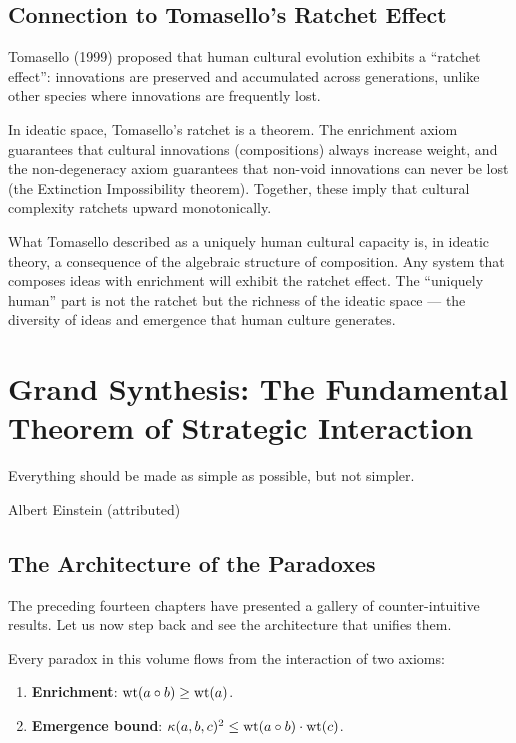 \section{Connection to Tomasello's Ratchet Effect}

Tomasello (1999) proposed that human cultural evolution exhibits a ``ratchet effect'': innovations are preserved and accumulated across generations, unlike other species where innovations are frequently lost.

In ideatic space, Tomasello's ratchet is a theorem. The enrichment axiom guarantees that cultural innovations (compositions) always increase weight, and the non-degeneracy axiom guarantees that non-void innovations can never be lost (the Extinction Impossibility theorem). Together, these imply that cultural complexity ratchets upward monotonically.

What Tomasello described as a uniquely human cultural capacity is, in ideatic theory, a consequence of the algebraic structure of composition. Any system that composes ideas with enrichment will exhibit the ratchet effect. The ``uniquely human'' part is not the ratchet but the richness of the ideatic space --- the diversity of ideas and emergence that human culture generates.


\chapter{Grand Synthesis: The Fundamental Theorem of Strategic Interaction}

\epigraph{Everything should be made as simple as possible, but not simpler.}{Albert Einstein (attributed)}

\section{The Architecture of the Paradoxes}

The preceding fourteen chapters have presented a gallery of counter-intuitive results. Let us now step back and see the architecture that unifies them.

Every paradox in this volume flows from the interaction of two axioms:
\begin{enumerate}
\item \textbf{Enrichment}: $\operatorname{wt}(a \circ b) \geq \operatorname{wt}(a)$.
\item \textbf{Emergence bound}: $\kappa(a,b,c)^2 \leq \operatorname{wt}(a \circ b) \cdot \operatorname{wt}(c)$.
\end{enumerate}

